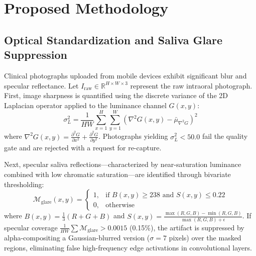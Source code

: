 \documentclass[journal]{IEEEtran}
\begin{document}
\section{Proposed Methodology}

\subsection{Optical Standardization and Saliva Glare Suppression}
Clinical photographs uploaded from mobile devices exhibit significant blur and specular reflectance. Let $I_{\text{raw}} \in \mathbb{R}^{H \times W \times 3}$ represent the raw intraoral photograph. First, image sharpness is quantified using the discrete variance of the 2D Laplacian operator applied to the luminance channel $G(x, y)$:
\begin{equation}
\sigma_L^2 = \frac{1}{HW} \sum_{x=1}^{H} \sum_{y=1}^{W} \left( \nabla^2 G(x, y) - \bar{\mu}_{\nabla^2 G} \right)^2
\label{eq:laplacian}
\end{equation}
where $\nabla^2 G(x, y) = \frac{\partial^2 G}{\partial x^2} + \frac{\partial^2 G}{\partial y^2}$. Photographs yielding $\sigma_L^2 < 50.0$ fail the quality gate and are rejected with a request for re-capture.

Next, specular saliva reflections---characterized by near-saturation luminance combined with low chromatic saturation---are identified through bivariate thresholding:
\begin{equation}
\mathcal{M}_{\text{glare}}(x, y) = \begin{cases} 1, & \text{if } B(x, y) \ge 238 \text{ and } S(x, y) \le 0.22 \\ 0, & \text{otherwise} \end{cases}
\label{eq:glare}
\end{equation}
where $B(x, y) = \frac{1}{3}(R + G + B)$ and $S(x, y) = \frac{\max(R, G, B) - \min(R, G, B)}{\max(R, G, B) + \epsilon}$. If specular coverage $\frac{1}{HW}\sum \mathcal{M}_{\text{glare}} > 0.0015$ (0.15\%), the artifact is suppressed by alpha-compositing a Gaussian-blurred version ($\sigma=7$ pixels) over the masked regions, eliminating false high-frequency edge activations in convolutional layers.
\end{document}
